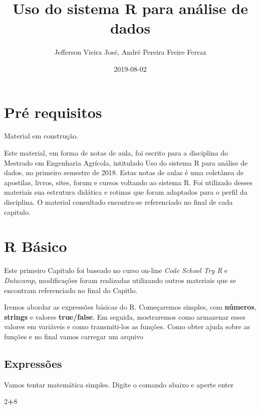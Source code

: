 \documentclass[]{book}
\title{Uso do sistema R para análise de dados}
\author{Jefferson Vieira José, André Pereira Freire Ferraz}
\date{2019-08-02}
\newenvironment{Shaded}{\begin{snugshade}}{\end{snugshade}}
\newcommand{\DecValTok}[1]{\textcolor[rgb]{0.00,0.00,0.81}{#1}}
\newcommand{\OperatorTok}[1]{\textcolor[rgb]{0.81,0.36,0.00}{\textbf{#1}}}
\begin{document}
\maketitle

{
\setcounter{tocdepth}{1}
\tableofcontents
}
\hypertarget{pre-requisitos}{%
\chapter{Pré requisitos}\label{pre-requisitos}}

Material em construção.

Este material, em forma de notas de aula, foi escrito para a disciplina do Mestrado em Engenharia Agrícola, intitulado Uso do sistema R para análise de dados, no primeiro semestre de 2018.
Estas notas de aulas é uma coletânea de apostilas, livros, sites, forum e cursos voltando ao sistema R. Foi utilizado desses materiais sua estrutura didática e rotinas que foram adaptados para o perfil da disciplina.
O material consultado encontra-se referenciado no final de cada capitulo.

\hypertarget{intro}{%
\chapter{R Básico}\label{intro}}

Este primeiro Capitulo foi baseado no curso on-line \emph{Code School Try R} e \emph{Datacamp}, modificações foram realizadas utilizando outros materiais que se encontram referenciado no final do Capitlo.

Iremos abordar as expressões básicas do R.
Começaremos simples, com \textbf{números}, \textbf{strings} e valores \textbf{true/false}. Em seguida, mostraremos como armazenar esses valores em variáveis e como transmiti-los as funções. Como obter ajuda sobre as funções e no final vamos carregar um arquivo

\hypertarget{expressoes}{%
\section{Expressões}\label{expressoes}}

Vamos tentar matemática simples. Digite o comando abaixo e aperte enter

\begin{Shaded}
\begin{Highlighting}[]
\DecValTok{2}\OperatorTok{+}\DecValTok{8}
\end{Highlighting}
\end{Shaded}
\end{document}
